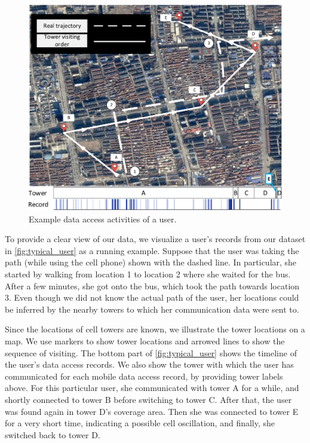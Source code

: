  \begin{figure}[h]
     \centering
     \includegraphics[width=0.8\linewidth]{./figures/typical_user.pdf}
     \caption{Example data access activities of a user.}
     \label{fig:typical_user}
     \vspace{-0.1in}
 \end{figure}

To provide a clear view of our data, we visualize a user's records from our dataset in \autoref{fig:typical_user} as a running example.
Suppose that the user was taking the path (while using the cell phone) shown with the dashed line.
In particular, she started by walking from location 1 to location 2 where she waited for the bus.
After a few minutes, she got onto the bus, which took the path towards location 3.
Even though we did not know the actual path of the user,
her locations could be inferred by the nearby towers to which her communication data were sent to.

Since the locations of cell towers are known, we illustrate the tower locations on a map.
We use markers to show tower locations and arrowed lines to show the sequence of visiting. The bottom part of \autoref{fig:typical_user} shows the timeline of the user's data access records. We also show the tower with which the user has communicated for each mobile data access record, by providing tower labels above.
For this particular user, she communicated with tower A for a while, 
and shortly connected to tower B before switching to tower C.
After that, the user was found again in tower D's coverage area.
Then she was connected to tower E for a very short time, indicating a possible cell oscillation, and finally, she switched back to tower D.



